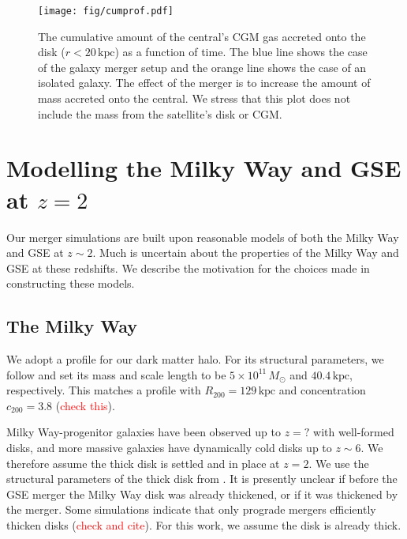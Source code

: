 \documentclass[linenumbers, twocolumn]{aastex631}
\newcommand{\Msun}{\ensuremath{M_{\odot}}}
\newcommand{\kpc}{\ensuremath{\textrm{kpc}}}
\begin{document}
\begin{figure}
  \centering
  \texttt{[image: fig/cumprof.pdf]}
  \caption{The cumulative amount of the central's CGM gas accreted onto the disk
  ($r<20\,\kpc$) as a function of time. The blue line shows the case of the
  galaxy merger setup and the orange line shows the case of an isolated galaxy.
  The effect of the merger is to increase the amount of mass accreted onto the
  central. We stress that this plot does not include the mass from the satellite's
  disk or CGM.}
  \label{fig:cumprof}
\end{figure}

{}




\appendix

\section{Modelling the Milky Way and GSE at $z=2$}


Our merger simulations are built upon reasonable models of both the Milky Way
and GSE at $z\sim2$. Much is uncertain about the properties of the Milky Way and
GSE at these redshifts.  We describe the motivation for the choices made in
constructing these models.

\subsection{The Milky Way}
We adopt a \citet{1990ApJ...356..359H} profile for our dark matter halo. For its
structural parameters, we follow \citet{2021ApJ...923...92N} and set its mass
and scale length to be $5\times10^{11}\,\Msun$ and $40.4\,\kpc$, respectively.
This matches a \citet{1996ApJ...462..563N} profile with
$R_{200}=129\,\textrm{kpc}$ and concentration $c_{200}=3.8$
(\textcolor{red}{check this}).

Milky Way-progenitor galaxies have been observed up to $z=?$ with well-formed
disks, and more massive galaxies have dynamically cold disks up to $z\sim6$. We
therefore assume the thick disk is settled and in place at $z=2$. We use the
structural parameters of the thick disk from . It is presently unclear if before
the GSE merger the Milky Way disk was already thickened, or if it was thickened
by the merger. Some simulations indicate that only prograde mergers efficiently
thicken disks (\textcolor{red}{check and cite}). For this work, we assume the
disk is already thick.
\end{document}

